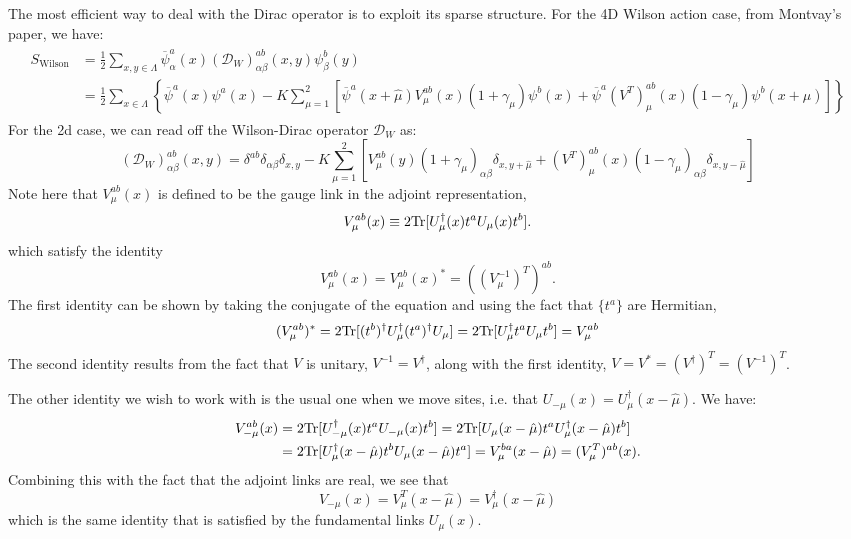 The most efficient way to deal with the Dirac operator is to exploit its sparse structure. For the 4D Wilson action case, from Montvay's paper, we have:
\begin{align}\begin{split}
	S_\mathrm{Wilson} &= \frac{1}{2} \sum_{x, y\in\Lambda} \overline\psi_\alpha^a(x) (\mathcal D_W)_{\alpha\beta}^{ab}(x, y) \psi_\beta^b(y) \\
	&= \frac{1}{2}  \sum_{x\in\Lambda} \left\{ \overline\psi^a(x) \psi^a(x) - K \sum_{\mu = 1}^2 \left[ \overline\psi^a(x + \hat\mu) V_\mu^{ab}(x) (1 + \gamma_\mu) \psi^b(x) + \overline\psi^a (V^T)_\mu^{ab} (x) (1 - \gamma_\mu) \psi^b(x + \hat\mu) \right] \right\}
\end{split}\end{align}
For the 2d case, we can read off the Wilson-Dirac operator $\mathcal D_W$ as:
\begin{equation}
	(\mathcal D_W)_{\alpha\beta}^{ab}(x, y) = \delta^{ab} \delta_{\alpha\beta} \delta_{x, y} - K \sum_{\mu = 1}^2 \left[ V_\mu^{ab}(y) (1 + \gamma_\mu)_{\alpha\beta} \delta_{x, y + \hat\mu} + (V^T)_\mu^{ab}(x) (1 - \gamma_\mu)_{\alpha\beta} \delta_{x, y - \hat\mu} \right]
	\label{eq:dirac_op_indices}
\end{equation}
Note here that $V_\mu^{ab}(x)$ is defined to be the gauge link in the adjoint representation,
\begin{equation}
	V_\mu^{ab}(x) \equiv 2\mathrm{Tr}[ U_\mu^\dagger(x) t^a U_\mu(x) t^b ]. 
\end{equation}
which satisfy the identity
\begin{equation}
	V_\mu^{ab}(x) = V_\mu^{ab}(x)^* = ((V_\mu^{-1})^T)^{ab}.
\end{equation}
The first identity can be shown by taking the conjugate of the equation and using the fact that $\{t^a\}$ are Hermitian,
\begin{equation}
	(V_\mu^{ab})^* = 2\mathrm{Tr} [ (t^b)^\dagger U_\mu^\dagger (t^a)^\dagger U_\mu] = 2\mathrm{Tr} [U_\mu^\dagger t^a U_\mu t^b] = V_\mu^{ab}
\end{equation}
The second identity results from the fact that $V$ is unitary, $V^{-1} = V^\dagger$, along with the first identity, $V = V^* = (V^\dagger)^T = (V^{-1})^T$. 


The other identity we wish to work with is the usual one when we move sites, i.e. that $U_{-\mu}(x) = U_\mu^\dagger(x - \hat\mu)$. We have:
\begin{align}\begin{split}
	V_{-\mu}^{ab}(x) &= 2\mathrm{Tr} [U_{-\mu}^\dagger(x) t^a U_{-\mu}(x) t^b] = 2 \mathrm{Tr} [U_\mu(x - \hat\mu) t^a U_\mu^\dagger (x - \hat\mu) t^b] \\
	&= 2\mathrm{Tr} [U_\mu^\dagger (x - \hat\mu) t^b U_\mu(x - \hat\mu) t^a] = V_\mu^{ba}(x - \hat\mu) = (V_\mu^T)^{ab}(x).
\end{split}\end{align}
Combining this with the fact that the adjoint links are real, we see that
\begin{equation}
	V_{-\mu}(x) = V_\mu^T(x - \hat\mu) = V_\mu^\dagger (x - \hat\mu)
\end{equation}
which is the same identity that is satisfied by the fundamental links $U_\mu(x)$. 

